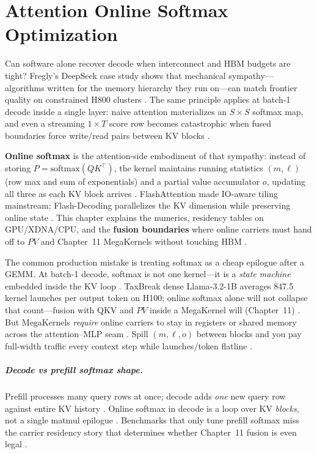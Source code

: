 \chapter{Attention Online Softmax Optimization}
\label{chap:ch10}

Can software alone recover decode when interconnect and HBM budgets are tight? Fregly's DeepSeek case study shows that mechanical sympathy---algorithms written for the memory hierarchy they run on---can match frontier quality on constrained H800 clusters \citep{liu2024deepseekv3,patel2025llminference}. The same principle applies at batch-1 decode inside a single layer: naive attention materializes an $S\times S$ softmax map, and even a streaming $1\times T$ score row becomes catastrophic when fused boundaries force write/read pairs between KV blocks \citep{dao2022flashattention,dao2023flashdecoding,memoryfloor2026}.

\textbf{Online softmax} is the attention-side embodiment of that sympathy: instead of storing $P=\mathrm{softmax}(QK^\top)$, the kernel maintains running statistics $(m,\ell)$ (row max and sum of exponentials) and a partial value accumulator $o$, updating all three as each KV block arrives \citep{dao2022flashattention}. FlashAttention made IO-aware tiling mainstream; Flash-Decoding parallelizes the KV dimension while preserving online state \citep{dao2023flashdecoding}. This chapter explains the numerics, residency tables on GPU/XDNA/CPU, and the \textbf{fusion boundaries} where online carriers must hand off to $PV$ and Chapter~11 MegaKernels without touching HBM \citep{taxbreak2026,yirage2026,chen2020compilerbasedhardw}.

The common production mistake is treating softmax as a cheap epilogue after a GEMM. At batch-1 decode, softmax is not one kernel---it is a \emph{state machine} embedded inside the KV loop \citep{kwon2023vllm,patel2025llminference}. TaxBreak dense Llama-3.2-1B averages 847.5 kernel launches per output token on H100; online softmax alone will not collapse that count---fusion with QKV and $PV$ inside a MegaKernel will (Chapter~11) \citep{taxbreak2026,nvidia2024cudagraphs}. But MegaKernels \emph{require} online carriers to stay in registers or shared memory across the attention--MLP seam \citep{semianalysis2024tma,amd2024aie}. Spill $(m,\ell,o)$ between blocks and you pay full-width traffic every context step while launches/token flatline \citep{memoryfloor2026}.

\paragraph{Decode vs prefill softmax shape.} Prefill processes many query rows at once; decode adds \emph{one} new query row against entire KV history \citep{dao2023flashdecoding,kwon2023vllm}. Online softmax in decode is a loop over KV \emph{blocks}, not a single matmul epilogue \citep{dao2022flashattention}. Benchmarks that only tune prefill softmax miss the carrier residency story that determines whether Chapter~11 fusion is even legal \citep{taxbreak2026,yirage2026}.


